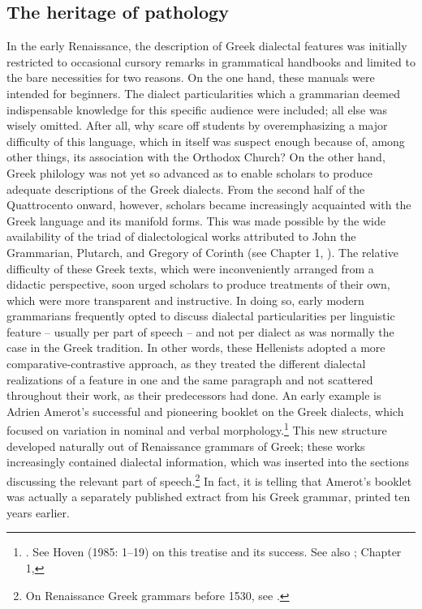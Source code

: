\subsection{The heritage of pathology}
\hypertarget{Toc19704845}{}
In the early Renaissance, the description of Greek dialectal features was initially restricted to occasional cursory remarks in grammatical handbooks and limited to the bare necessities for two reasons. On the one hand, these manuals were intended for beginners. The dialect particularities which a grammarian deemed indispensable knowledge for this specific audience were included; all else was wisely omitted. After all, why scare off students by overemphasizing a major difficulty of this language, which in itself was suspect enough because of, among other things, its association with the Orthodox Church? On the other hand, Greek philology was not yet so advanced as to enable scholars to produce adequate descriptions of the Greek dialects. From the second half of the Quattrocento onward, however, scholars became increasingly acquainted with the Greek language and its manifold forms. This was made possible by the wide availability of the triad of dialectological works attributed to John the Grammarian, Plutarch, and Gregory of Corinth (see Chapter 1, ). The relative difficulty of these Greek texts, which were inconveniently arranged from a didactic perspective, soon urged scholars to produce treatments of their own, which were more transparent and instructive. In doing so, early modern grammarians frequently opted to discuss dialectal particularities per linguistic feature – usually per part of speech – and not per dialect as was normally the case in the Greek tradition. In other words, these Hellenists adopted a more comparative-contrastive approach, as they treated the different dialectal realizations of a feature in one and the same paragraph and not scattered throughout their work, as their predecessors had done. An early example is Adrien Amerot’s successful and pioneering booklet on the Greek dialects, which focused on variation in nominal and verbal morphology.\footnote{ \textrm{\citet{Amerot1530}. See Hoven (1985: 1–19) on this treatise and its success. See also \citet{Hummel1999}; Chapter 1, }} This new structure developed naturally out of Renaissance grammars of Greek; these works increasingly contained dialectal information, which was inserted into the sections discussing the relevant part of speech.\footnote{ \textrm{On Renaissance Greek grammars before 1530, see \citet{Botley2010}.}} In fact, it is telling that Amerot’s booklet was actually a separately published extract from his Greek grammar, printed ten years earlier.

